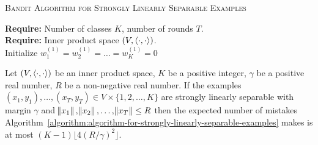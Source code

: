\begin{algorithm}[h]
\SetAlgoLined
\LinesNumbered
\caption{\textsc{Bandit Algorithm for Strongly Linearly Separable Examples}
\label{algorithm:algorithm-for-strongly-linearly-separable-examples}}
\textbf{Require:} Number of classes $K$, number of rounds $T$. \\
\textbf{Require:} Inner product space $(V,\left\langle \cdot, \cdot \right\rangle)$.  \\
\nl Initialize $w_1^{(1)} = w_2^{(1)} = \dots = w_K^{(1)} = 0$\\
\nl {}

\end{algorithm}

\begin{theorem}
\label{theorem:strongly-separable-examples-mistake-upper-bound}
Let $(V, \left\langle \cdot, \cdot \right\rangle)$ be an inner product space, $K$ be a positive
integer, $\gamma$ be a positive real number, $R$ be a non-negative real number.
If the examples $(x_1, y_1), \dots, (x_T, y_T) \in V \times \{1,2,\dots,K\}$ are
strongly linearly separable with margin $\gamma$ and $\norm{x_1}, \norm{x_2},
\dots, \norm{x_T} \le R$ then the expected number of mistakes
Algorithm~\ref{algorithm:algorithm-for-strongly-linearly-separable-examples}
makes is at most $(K-1) \lfloor 4(R/\gamma)^2 \rfloor$.
\end{theorem}

